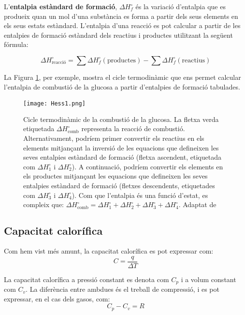 L'{\bf entalpia estàndard de formació}, $\Delta H_f^\circ$ és la variació d'entalpia que es produeix quan un mol d'una substància es forma a partir dels seus elements en els seus estats estàndard. L'entalpia d'una reacció es pot calcular a partir de les entalpies de formació estàndard dels reactius i productes utilitzant la següent fórmula:

\begin{equation}
\Delta H^\circ_{\text{reacció}} = \sum \Delta H^\circ_f (\text{productes}) - \sum \Delta H^\circ_f (\text{reactius})
\end{equation}

La Figura \ref{Fig:combustioGlucosa}, per exemple, mostra el cicle termodinàmic que ens permet calcular l'entalpia de combustió de la glucosa a partir d'entalpies de formació tabulades.

\begin{figure}[htbp]
    \centering
        \texttt{[image: Hess1.png]}
    \caption{Cicle termodinàmic de la combustió de la glucosa.
    La fletxa verda etiquetada \(\Delta H^\circ_{\text{comb}}\) representa la reacció de combustió. Alternativament, podríem primer convertir els reactius en els elements mitjançant la inversió de les equacions que defineixen les seves entalpies estàndard de formació (fletxa ascendent, etiquetada com \(\Delta H^\circ_1\) i \(\Delta H^\circ_2\)).      
    A continuació, podríem convertir els elements en els productes mitjançant les equacions que defineixen les seves entalpies estàndard de formació (fletxes descendents, etiquetades com \(\Delta H^\circ_3\) i \(\Delta H^\circ_4\)).  
        Com que l'entalpia és una funció d'estat, es compleix que:  
    $\Delta H^\circ_{\text{comb}} = \Delta H^\circ_1 + \Delta H^\circ_2 + \Delta H^\circ_3 + \Delta H^\circ_4$. Adaptat de \cite{noauthor_78_2015}}
    \label{Fig:combustioGlucosa}
\end{figure} 

\subsection{Capacitat calorífica}   

Com hem vist més amunt, la capacitat calorífica es pot expressar com:
\begin{equation}
    C = \frac{q}{\Delta T}
\end{equation}

La capacitat calorífica a pressió constant es denota com $C_p$ i a volum constant com $C_v$. La diferència entre ambdues és el treball de compressió, i es pot expressar, en el cas dels gasos, com:
\begin{equation}
    C_p - C_v = R
\end{equation}

